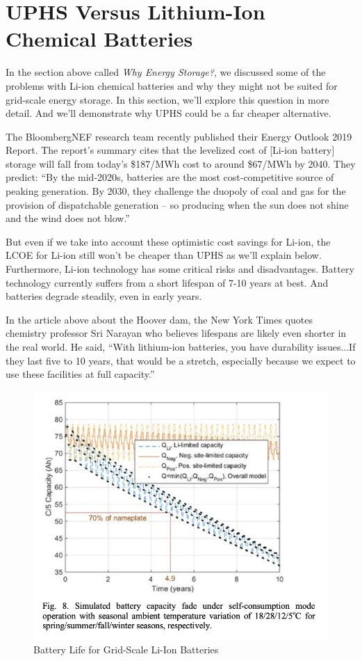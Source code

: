 \documentclass[hidelinks,12pt,a4paper]{article}
\begin{document}
\pagebreak[2]
\section{UPHS Versus Lithium-Ion Chemical Batteries}
In the section above called \textit{Why Energy Storage?}, we discussed some of the problems with Li-ion chemical batteries and why they might not be suited for grid-scale energy storage. In this section, we'll explore this question in more detail. And we'll demonstrate why UPHS could be a far cheaper alternative.

The BloombergNEF research team recently published their Energy Outlook 2019 Report. The report's summary cites that the levelized cost of [Li-ion battery] storage will fall from today's \$187/MWh cost to around \$67/MWh by 2040. \cite{NewEnergyOutlook2019Report} They predict: “By the mid-2020s, batteries are the most cost-competitive source of peaking generation. By 2030, they challenge the duopoly of coal and gas for the provision of dispatchable generation – so producing when the sun does not shine and the wind does not blow.” \cite{NewEnergyOutlook2019Report}

But even if we take into account these optimistic cost savings for Li-ion, the LCOE for Li-ion still won't be cheaper than UPHS as we'll explain below. Furthermore, Li-ion technology has some critical risks and disadvantages. Battery technology currently suffers from a short lifespan of 7-10 years at best. And batteries degrade steadily, even in early years. \cite{LifePredictionModelForLiIonBattery}

In the article above about the Hoover dam, the New York Times quotes chemistry professor Sri Narayan who believes lifespans are likely even shorter in the real world. He said, “With lithium-ion batteries, you have durability issues...If they last five to 10 years, that would be a stretch, especially because we expect to use these facilities at full capacity.” \cite{The3BillionPlanToTurnHooverDamIntoAGiantBattery}

\begin{figure}[ht!]
    \centering
    \includegraphics[width=.85\textwidth]{li-ion-battery-life.png}
    \caption{Battery Life for Grid-Scale Li-Ion Batteries \cite{LifePredictionModelForLiIonBattery}}
\end{figure}
\FloatBarrier
\end{document}
